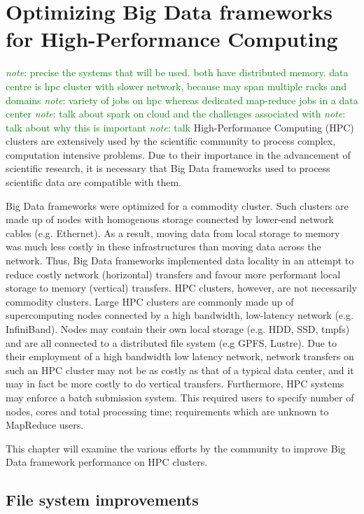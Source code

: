 \documentclass{report}
\newcommand{\note}[1]{\textcolor{green}{\textit{note}: #1}}
\begin{document}
\chapter{Optimizing Big Data frameworks for High-Performance Computing}
	
	\note{precise the systems that will be used. both have distributed memory. data centre is hpc cluster with slower network, because may span multiple racks and domains}
	\note{variety of jobs on hpc whereas dedicated map-reduce jobs in a data center}
	\note{talk about spark on cloud and the challenges associated with}
	\note{talk about why this is important}
	\note{talk }
	High-Performance Computing (HPC) clusters are extensively used by the scientific community to process complex, computation intensive problems. Due to their importance in the advancement of scientific research, it is necessary that Big Data frameworks used to process scientific data are compatible with them. 
	
	Big Data frameworks were optimized for a commodity cluster.  Such clusters are made up of nodes with homogenous storage connected by lower-end network cables (e.g. Ethernet). As a result, moving data from local storage to memory was much less costly in these infrastructures than moving data across the network. Thus, Big Data frameworks implemented data locality in an attempt to reduce costly network (horizontal) transfers and favour more performant local storage to memory (vertical) transfers. HPC clusters, however, are not necessarily commodity clusters. Large HPC clusters are commonly made up of supercomputing nodes connected by a high bandwidth, low-latency network (e.g. InfiniBand). Nodes may contain their own local storage (e.g. HDD, SSD, tmpfs) and are all connected to a distributed file system (e.g GPFS, Lustre).  Due to their employment of a high bandwidth low latency network, network transfers on such an HPC cluster may not be as costly as that of a typical data center, and it may in fact be more costly to do vertical transfers. Furthermore, HPC systems may enforce a batch submission system. This required users to specify number of nodes, cores and total processing time; requirements which are unknown to MapReduce users.
	
	This chapter will examine the various efforts by the community to improve Big Data framework performance on HPC clusters.
	
	\section{File system improvements}
	
\end{document}
